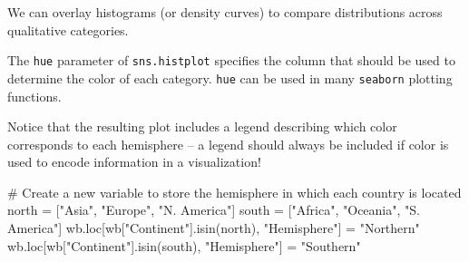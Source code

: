 \documentclass[
  letterpaper,
  DIV=11,
  numbers=noendperiod]{scrreprt}
\newenvironment{Shaded}{\begin{snugshade}}{\end{snugshade}}
\newcommand{\CommentTok}[1]{\textcolor[rgb]{0.37,0.37,0.37}{#1}}
\newcommand{\NormalTok}[1]{\textcolor[rgb]{0.00,0.23,0.31}{#1}}
\newcommand{\OperatorTok}[1]{\textcolor[rgb]{0.37,0.37,0.37}{#1}}
\newcommand{\StringTok}[1]{\textcolor[rgb]{0.13,0.47,0.30}{#1}}
\begin{document}
We can overlay histograms (or density curves) to compare distributions
across qualitative categories.

The \texttt{hue} parameter of \texttt{sns.histplot} specifies the column
that should be used to determine the color of each category.
\texttt{hue} can be used in many \texttt{seaborn} plotting functions.

Notice that the resulting plot includes a legend describing which color
corresponds to each hemisphere -- a legend should always be included if
color is used to encode information in a visualization!

\begin{Shaded}
\begin{Highlighting}[]
\CommentTok{\# Create a new variable to store the hemisphere in which each country is located}
\NormalTok{north }\OperatorTok{=}\NormalTok{ [}\StringTok{"Asia"}\NormalTok{, }\StringTok{"Europe"}\NormalTok{, }\StringTok{"N. America"}\NormalTok{]}
\NormalTok{south }\OperatorTok{=}\NormalTok{ [}\StringTok{"Africa"}\NormalTok{, }\StringTok{"Oceania"}\NormalTok{, }\StringTok{"S. America"}\NormalTok{]}
\NormalTok{wb.loc[wb[}\StringTok{"Continent"}\NormalTok{].isin(north), }\StringTok{"Hemisphere"}\NormalTok{] }\OperatorTok{=} \StringTok{"Northern"}
\NormalTok{wb.loc[wb[}\StringTok{"Continent"}\NormalTok{].isin(south), }\StringTok{"Hemisphere"}\NormalTok{] }\OperatorTok{=} \StringTok{"Southern"}
\end{Highlighting}
\end{Shaded}

\begin{Shaded}
\end{Shaded}
\end{document}
